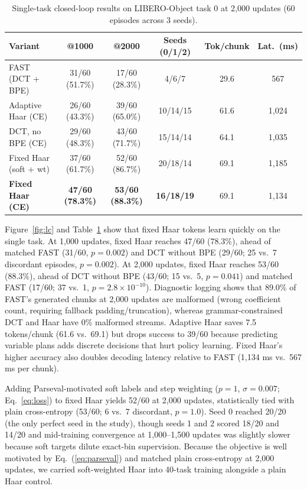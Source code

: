 \documentclass[10pt]{article}
\begin{document}
\begin{table}[t]
  \centering
  \caption{Single-task closed-loop results on LIBERO-Object task 0 at 2,000 updates (60 episodes across 3 seeds).}
  \label{tab:single}
  \footnotesize
  \setlength{\tabcolsep}{4pt}
  \begin{tabular}{@{}lccccc@{}}
    \toprule
    Variant & @1000 & @2000 & Seeds (0/1/2) & Tok/chunk & Lat.\ (ms) \\
    \midrule
    FAST (DCT + BPE) & 31/60 (51.7\%) & 17/60 (28.3\%) & 4/6/7 & 29.6 & 567 \\
    Adaptive Haar (CE) & 26/60 (43.3\%) & 39/60 (65.0\%) & 10/14/15 & 61.6 & 1,024 \\
    DCT, no BPE (CE) & 29/60 (48.3\%) & 43/60 (71.7\%) & 15/14/14 & 64.1 & 1,035 \\
    Fixed Haar (soft + wt) & 37/60 (61.7\%) & 52/60 (86.7\%) & 20/18/14 & 69.1 & 1,185 \\
    \textbf{Fixed Haar (CE)} & \textbf{47/60 (78.3\%)} & \textbf{53/60 (88.3\%)} & \textbf{16/18/19} & 69.1 & 1,134 \\
    \bottomrule
  \end{tabular}
\end{table}

Figure~\ref{fig:lc} and Table~\ref{tab:single} show that fixed Haar tokens learn quickly on the single task.
At 1,000 updates, fixed Haar reaches 47/60 (78.3\%), ahead of matched FAST (31/60, $p=0.002$) and DCT without BPE (29/60; 25 vs.\ 7 discordant episodes, $p=0.002$).
At 2,000 updates, fixed Haar reaches 53/60 (88.3\%), ahead of DCT without BPE (43/60; 15 vs.\ 5, $p=0.041$) and matched FAST (17/60; 37 vs.\ 1, $p=2.8\times 10^{-10}$).
Diagnostic logging shows that 89.0\% of FAST's generated chunks at 2,000 updates are malformed (wrong coefficient count, requiring fallback padding/truncation), whereas grammar-constrained DCT and Haar have 0\% malformed streams.
Adaptive Haar saves 7.5 tokens/chunk (61.6 vs.\ 69.1) but drops success to 39/60 because predicting variable plans adds discrete decisions that hurt policy learning.
Fixed Haar's higher accuracy also doubles decoding latency relative to FAST (1,134 ms vs.\ 567 ms per chunk).

Adding Parseval-motivated soft labels and step weighting ($p=1$, $\sigma=0.007$; Eq.~\ref{eq:loss}) to fixed Haar yields 52/60 at 2,000 updates, statistically tied with plain cross-entropy (53/60; 6 vs.\ 7 discordant, $p=1.0$).
Seed 0 reached 20/20 (the only perfect seed in the study), though seeds 1 and 2 scored 18/20 and 14/20 and mid-training convergence at 1,000--1,500 updates was slightly slower because soft targets dilute exact-bin supervision.
Because the objective is well motivated by Eq.~(\ref{eq:parseval}) and matched plain cross-entropy at 2,000 updates, we carried soft-weighted Haar into 40-task training alongside a plain Haar control.
\end{document}
